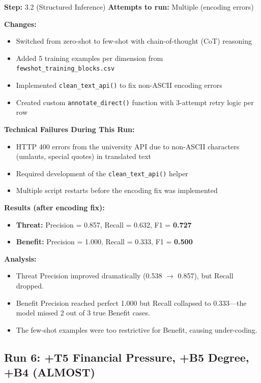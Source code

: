 \textbf{Step:} 3.2 (Structured Inference) \quad \textbf{Attempts to run:} Multiple (encoding errors)

\textbf{Changes:}
\begin{itemize}
    \item Switched from zero-shot to few-shot with chain-of-thought (CoT) reasoning
    \item Added 5 training examples per dimension from \texttt{fewshot\_training\_blocks.csv}
    \item Implemented \texttt{clean\_text\_api()} to fix non-ASCII encoding errors
    \item Created custom \texttt{annotate\_direct()} function with 3-attempt retry logic per row
\end{itemize}

\textbf{Technical Failures During This Run:}
\begin{itemize}
    \item \textcolor{fail}{HTTP 400 errors} from the university API due to non-ASCII characters (umlauts, special quotes) in translated text
    \item Required development of the \texttt{clean\_text\_api()} helper
    \item Multiple script restarts before the encoding fix was implemented
\end{itemize}

\textbf{Results (after encoding fix):}
\begin{itemize}
    \item \textbf{Threat:} Precision = 0.857, Recall = 0.632, F1 = \textbf{0.727}
    \item \textbf{Benefit:} Precision = 1.000, Recall = 0.333, F1 = \textbf{0.500}
\end{itemize}

\textbf{Analysis:}
\begin{itemize}
    \item Threat Precision improved dramatically (0.538 $\rightarrow$ 0.857), but Recall dropped.
    \item Benefit Precision reached perfect 1.000 but Recall collapsed to 0.333---the model missed 2 out of 3 true Benefit cases.
    \item The few-shot examples were too restrictive for Benefit, causing under-coding.
\end{itemize}

\subsection{Run 6: +T5 Financial Pressure, +B5 Degree, +B4 (ALMOST)}
\label{sec:run6}

